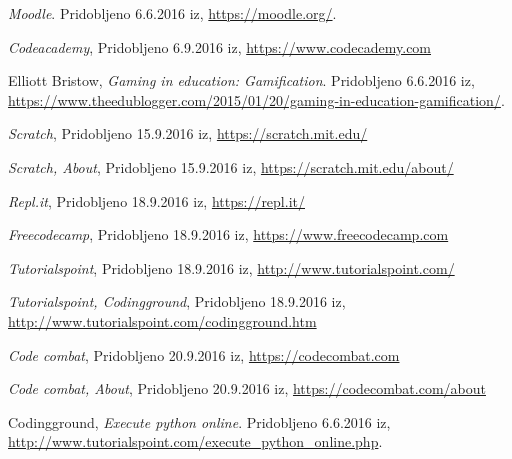 \begin{thebibliography}{9}
 \emph{Moodle}. Pridobljeno 6.6.2016 iz,
  \url{https://moodle.org/}.

 \emph{Codeacademy}, Pridobljeno 6.9.2016 iz,
  \url{https://www.codecademy.com}

 Elliott Bristow, \emph{Gaming in education: Gamification}. Pridobljeno 6.6.2016 iz,
  \url{https://www.theedublogger.com/2015/01/20/gaming-in-education-gamification/}.

 \emph{Scratch}, Pridobljeno 15.9.2016 iz,
  \url{https://scratch.mit.edu/}

 \emph{Scratch, About}, Pridobljeno 15.9.2016 iz,
  \url{https://scratch.mit.edu/about/}

 \emph{Repl.it}, Pridobljeno 18.9.2016 iz,
  \url{https://repl.it/}

 \emph{Freecodecamp}, Pridobljeno 18.9.2016 iz,
  \url{https://www.freecodecamp.com}

 \emph{Tutorialspoint}, Pridobljeno 18.9.2016 iz,
  \url{http://www.tutorialspoint.com/}

 \emph{Tutorialspoint,
    Codingground}, Pridobljeno 18.9.2016 iz,
  \url{http://www.tutorialspoint.com/codingground.htm}

 \emph{Code combat}, Pridobljeno 20.9.2016 iz,
  \url{https://codecombat.com}

 \emph{Code combat, About}, Pridobljeno 20.9.2016 iz,
  \url{https://codecombat.com/about}









 Codingground, \emph{Execute python
    online}. Pridobljeno 6.6.2016 iz,
  \url{http://www.tutorialspoint.com/execute_python_online.php}.







\end{thebibliography}
